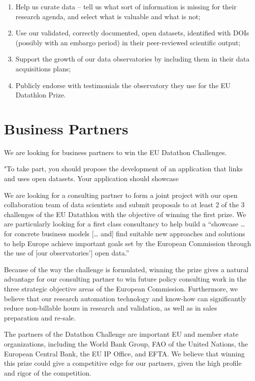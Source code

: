 \documentclass[
  a4paper,
  openany, a4paper, oneside]{book}
\providecommand{\tightlist}{%
  \setlength{\itemsep}{0pt}\setlength{\parskip}{0pt}}
\begin{document}
\begin{enumerate}
\def\labelenumi{\arabic{enumi}.}
\tightlist
\item
  Help us curate data -- tell us what sort of information is missing for their research agenda, and select what is valuable and what is not;
\item
  Use our validated, correctly documented, open datasets, identified with DOIs (possibly with an embargo period) in their peer-reviewed scientific output;
\item
  Support the growth of our data observatories by including them in their data acquisitions plans;
\item
  Publicly endorse with testimonials the observatory they use for the EU Datathlon Prize.
\end{enumerate}

\hypertarget{business-partners}{%
\section{Business Partners}\label{business-partners}}

We are looking for business partners to win the EU Datathon Challenges.

"To take part, you should propose the development of an application that links and uses open datasets. Your application should showcase

We are looking for a consulting partner to form a joint project with our open collaboration team of data scientists and submit proposals to at least 2 of the 3 challenges of the EU Datathlon with the objective of winning the first prize. We are particularly looking for a first class consultancy to help build a ``showcase \ldots{} for concrete business models {[}\ldots{} and{]} find suitable new approaches and solutions to help Europe achieve important goals set by the European Commission through the use of {[}our observatories'{]} open data.''

Because of the way the challenge is formulated, winning the prize gives a natural advantage for our consulting partner to win future policy consulting work in the three strategic objective areas of the European Commission. Furthermore, we believe that our research automation technology and know-how can significantly reduce non-billable hours in research and validation, as well as in sales preparation and re-sale.

The partners of the Datathon Challenge are important EU and member state organizations, including the World Bank Group, FAO of the United Nations, the European Central Bank, the EU IP Office, and EFTA. We believe that winning this prize could give a competitive edge for our partners, given the high profile and rigor of the competition.

  
\end{document}
